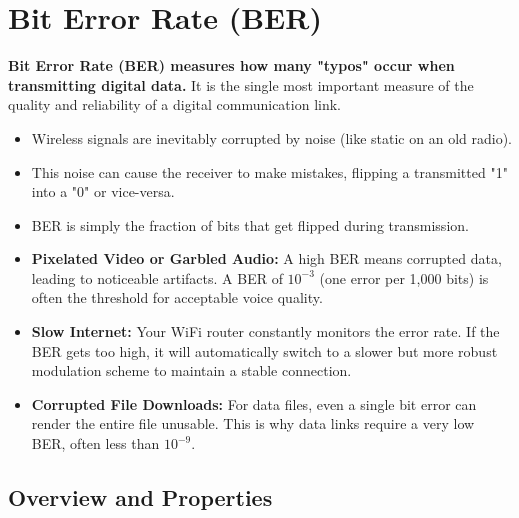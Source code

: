 
\chapter{Bit Error Rate (BER)}
\label{ch:ber}

\begin{nontechnical}
    \textbf{Bit Error Rate (BER) measures how many "typos" occur when transmitting digital data.} It is the single most important measure of the quality and reliability of a digital communication link.

    \begin{itemize}
        \item Wireless signals are inevitably corrupted by noise (like static on an old radio).
        \item This noise can cause the receiver to make mistakes, flipping a transmitted "1" into a "0" or vice-versa.
        \item BER is simply the fraction of bits that get flipped during transmission.
    \end{itemize}

    \begin{itemize}
        \item \textbf{Pixelated Video or Garbled Audio:} A high BER means corrupted data, leading to noticeable artifacts. A BER of $10^{-3}$ (one error per 1,000 bits) is often the threshold for acceptable voice quality.
        \item \textbf{Slow Internet:} Your WiFi router constantly monitors the error rate. If the BER gets too high, it will automatically switch to a slower but more robust modulation scheme to maintain a stable connection.
        \item \textbf{Corrupted File Downloads:} For data files, even a single bit error can render the entire file unusable. This is why data links require a very low BER, often less than $10^{-9}$.
    \end{itemize}
\end{nontechnical}


\section{Overview and Properties}

